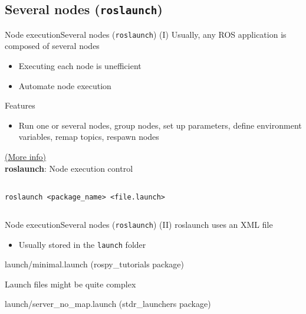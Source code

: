 \documentclass[10pt,compress]{beamer} %
\begin{document}
\subsection{Several nodes (\texttt{roslaunch})}
\begin{frame}{Node execution}{Several nodes (\texttt{roslaunch}) (I)}
	Usually, any ROS application is composed of several nodes
	\begin{itemize}
		\item Executing each node is unefficient
		\item Automate node execution
	\end{itemize}

	Features
	\begin{itemize}
		\item Run one or several nodes, group nodes, set up parameters, define environment variables, remap topics, respawn nodes
	\end{itemize}

	\href{http://wiki.ros.org/roslaunch}{(More info)}\\
	\textbf{roslaunch}: Node execution control
    \begin{columns}
	   \begin{block}{}
	   \texttt{roslaunch <package\_name> <file.launch>}
	   \end{block}
	\end{columns}
	\bigskip

\end{frame}

\begin{frame}{Node execution}{Several nodes (\texttt{roslaunch}) (II)}
	\vspace{-0.2cm}
	roslaunch uses an XML file
	\begin{itemize}
	\item Usually stored in the \texttt{launch} folder
	\end{itemize}

	\vspace{-0.2cm}
    \begin{exampleblock}{launch/minimal.launch (rospy\_tutorials package)}
		\vspace{-0.2cm}
	    
		\vspace{-0.2cm}
    \end{exampleblock}

	Launch files might be quite complex

	\vspace{-0.2cm}
    \begin{exampleblock}{launch/server\_no\_map.launch (stdr\_launchers package)}
		\vspace{-0.2cm}
	    
		\vspace{-0.2cm}
    \end{exampleblock}

\end{frame}
\end{document}
